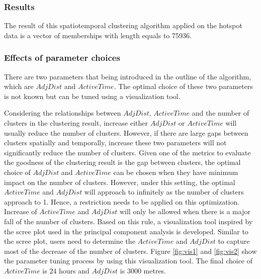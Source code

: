 \hypertarget{results}{%
\subsubsection{Results}\label{results}}

The result of this spatiotemporal clustering algorithm applied on the
hotspot data is a vector of memberships with length equals to 75936.

\hypertarget{effects-of-parameter-choices}{%
\subsubsection{Effects of parameter
choices}\label{effects-of-parameter-choices}}

There are two parameters that being introduced in the outline of the
algorithm, which are \(AdjDist\) and \(ActiveTime\). The optimal choice
of these two parameters is not known but can be tuned using a
visualization tool.

Considering the relationships between \(AdjDist\), \(ActiveTime\) and
the number of clusters in the clustering result, increase either
\(AdjDist\) or \(ActiveTime\) will usually reduce the number of
clusters. However, if there are large gaps between clusters spatially
and temporally, increase these two parameters will not significantly
reduce the number of clusters. Given one of the metrics to evaluate the
goodness of the clustering result is the gap between clusters, the
optimal choice of \(AdjDist\) and \(ActiveTime\) can be chosen when they
have minimum impact on the number of clusters. However, under this
setting, the optimal \(ActiveTime\) and \(AdjDist\) will approach to
infinitely as the number of clusters approach to 1. Hence, a restriction
needs to be applied on this optimization. Increase of \(ActiveTime\) and
\(AdjDist\) will only be allowed when there is a major fall of the
number of clusters. Based on this rule, a visualization tool inspired by
the scree plot used in the principal component analysis is developed.
Similar to the scree plot, users need to determine the \(ActiveTime\)
and \(AdjDist\) to capture most of the decrease of the number of
clusters. Figure \ref{fig:vis1} and \ref{fig:vis2} show the parameter
tuning process by using this visualization tool. The final choice of
\(ActiveTime\) is \(24\) hours and \(AdjDist\) is \(3000\) metres.

